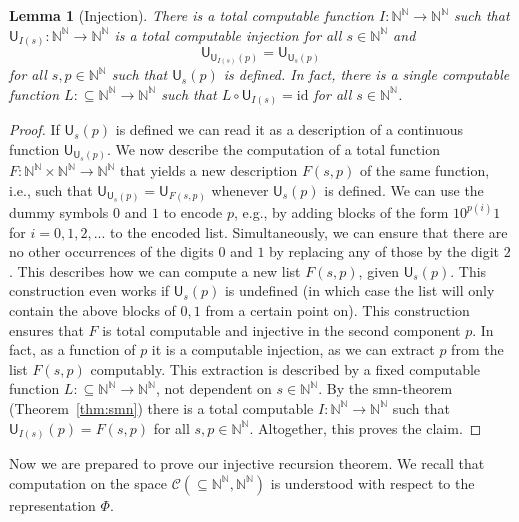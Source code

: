 \documentclass[11pt,a4paper]{amsart}
\theoremstyle{plain}
\newtheorem{lem}[thm]{Lemma}
\theoremstyle{definition}
\theoremstyle{defC}
\theoremstyle{thmC}
\theoremstyle{plain}
\numberwithin{equation}{section}
\def\CC{{\mathcal C}}
\def\IN{{\mathbb{N}}}
\def\In{\subseteq}
\def\U{{\mathsf{{U}}}}
\def\id{{\mathrm{id}}}
\begin{document}
\begin{lem}[Injection]
\label{lem:injection}
There is a total computable function $I:\IN^\IN\to\IN^\IN$ such that
$\U_{I(s)}:\IN^\IN\to\IN^\IN$ is a total computable injection for all $s\in\IN^\IN$ and
\[\U_{\U_{I(s)}(p)}=\U_{\U_s(p)}\]
for all $s,p\in\IN^\IN$ such that $\U_s(p)$ is defined. In fact, there is a single computable
function $L:\In\IN^\IN\to\IN^\IN$ such that $L\circ\U_{I(s)}=\id$ for all $s\in\IN^\IN$.
\end{lem}
\begin{proof}
If $\U_s(p)$ is defined we can read it as a description of a continuous function $\U_{\U_s(p)}$.
We now describe the computation of a total function $F:\IN^\IN\times\IN^\IN\to\IN^\IN$ that
yields a new description $F(s,p)$ of the same function, i.e., such that $\U_{\U_s(p)}=\U_{F(s,p)}$
whenever $\U_s(p)$ is defined. 
We can use the dummy symbols
$0$ and $1$ to encode $p$, e.g., by adding blocks of the form $10^{p(i)}1$ for $i=0,1,2,...$ to the encoded list.
Simultaneously, we can ensure that there are no other occurrences of the digits $0$ and $1$ by replacing
any of those by the digit $2$.
This describes how we can compute a new list $F(s,p)$, given $\U_s(p)$. 
This construction even works if $\U_s(p)$ is undefined (in which case the list will only contain the above blocks of $0,1$ from
a certain point on). 
This construction ensures that
$F$ is total computable and injective in the second component $p$. In fact, as a function of $p$ 
it is a computable injection, as we can extract $p$ from the list $F(s,p)$ computably. 
This extraction is described by a fixed computable function $L:\In\IN^\IN\to\IN^\IN$, not dependent on $s\in\IN^\IN$.
By the smn-theorem (Theorem~\ref{thm:smn}) 
there is 
a total computable $I:\IN^\IN\to\IN^\IN$ such that $\U_{I(s)}(p)=F(s,p)$ for all $s,p\in\IN^\IN$.
Altogether, this proves the claim.
\end{proof}

\noindent
Now we are prepared to prove our injective recursion theorem. We recall that computation on the space
$\CC(\In\IN^\IN,\IN^\IN)$ is understood with respect to the representation $\Phi$.
\end{document}
